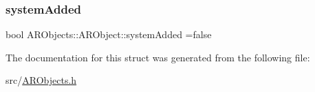 \mbox{\label{struct_a_r_objects_1_1_a_r_object_abb84b8f934ab23b396cc1904ba5c5569}} 
\subsubsection{\texorpdfstring{system\+Added}{systemAdded}}
{\footnotesize\ttfamily bool A\+R\+Objects\+::\+A\+R\+Object\+::system\+Added =false}



The documentation for this struct was generated from the following file\+:\begin{DoxyCompactItemize}
\item 
src/\hyperlink{_a_r_objects_8h}{A\+R\+Objects.\+h}\end{DoxyCompactItemize}
